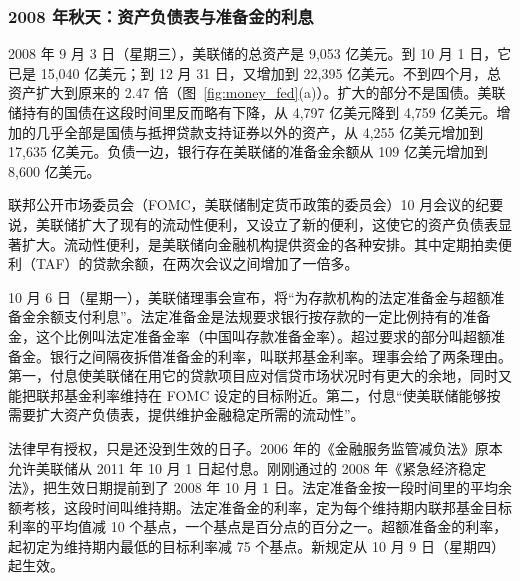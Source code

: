 \subsubsection{2008 年秋天：资产负债表与准备金的利息}
2008 年 9 月 3 日（星期三），美联储的总资产是 9,053 亿美元。到 10 月 1 日，它已是 15,040 亿美元；到 12 月 31 日，又增加到 22,395 亿美元。不到四个月，总资产扩大到原来的 2.47 倍（图~\ref{fig:money_fed}(a)）。扩大的部分不是国债。美联储持有的国债在这段时间里反而略有下降，从 4,797 亿美元降到 4,759 亿美元。增加的几乎全部是国债与抵押贷款支持证券以外的资产，从 4,255 亿美元增加到 17,635 亿美元。负债一边，银行存在美联储的准备金余额从 109 亿美元增加到 8,600 亿美元\cite{fred2026m}。

联邦公开市场委员会（FOMC，美联储制定货币政策的委员会）10 月会议的纪要说，美联储扩大了现有的流动性便利，又设立了新的便利，这使它的资产负债表显著扩大。流动性便利，是美联储向金融机构提供资金的各种安排。其中定期拍卖便利（TAF）的贷款余额，在两次会议之间增加了一倍多\cite{fomc2008min}。


10 月 6 日（星期一），美联储理事会宣布，将“为存款机构的法定准备金与超额准备金余额支付利息”。法定准备金是法规要求银行按存款的一定比例持有的准备金，这个比例叫法定准备金率（中国叫存款准备金率）。超过要求的部分叫超额准备金。银行之间隔夜拆借准备金的利率，叫联邦基金利率。理事会给了两条理由。第一，付息使美联储在用它的贷款项目应对信贷市场状况时有更大的余地，同时又能把联邦基金利率维持在 FOMC 设定的目标附近。第二，付息“使美联储能够按需要扩大资产负债表，提供维护金融稳定所需的流动性”\cite{fed2008ior}。

法律早有授权，只是还没到生效的日子。2006 年的《金融服务监管减负法》原本允许美联储从 2011 年 10 月 1 日起付息。刚刚通过的 2008 年《紧急经济稳定法》，把生效日期提前到了 2008 年 10 月 1 日。法定准备金按一段时间里的平均余额考核，这段时间叫维持期。法定准备金的利率，定为每个维持期内联邦基金目标利率的平均值减 10 个基点，一个基点是百分点的百分之一。超额准备金的利率，起初定为维持期内最低的目标利率减 75 个基点。新规定从 10 月 9 日（星期四）起生效\cite{fed2008ior}。


